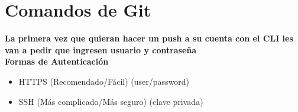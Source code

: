 \documentclass{beamer}
\begin{document}
\section{Comandos de Git}
	\begin{frame}
		\textbf{La primera vez que quieran hacer un push a su cuenta con el CLI les van a pedir que ingresen usuario y contraseña} \\
		\vspace{1cm}
		\textbf{Formas de Autenticación}
		\begin{itemize}
			\item HTTPS (Recomendado/Fácil) (user/password)
			\item SSH (Más complicado/Más seguro) (clave privada)
		\end{itemize}
	\end{frame}
\end{document}
